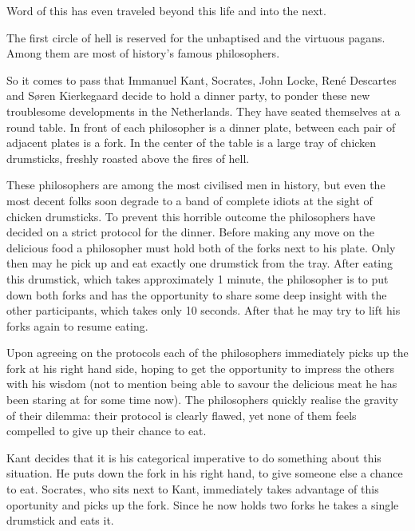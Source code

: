 


{\StandaardZin}
Word of this has even traveled beyond this life and into the next.

The first circle of hell is reserved for the unbaptised and the virtuous pagans.
Among them are most of history's famous philosophers.

So it comes to pass that
Immanuel Kant,
Socrates,
John Locke,
Ren\'e Descartes and
S{\o}ren Kierkegaard
decide to hold a dinner party, to ponder these new troublesome developments in the Netherlands.
They have seated themselves at a round table.
In front of each philosopher is a dinner plate, between each pair of adjacent plates is a fork.
In the center of the table is a large tray of chicken drumsticks, freshly roasted above the fires of hell.

These philosophers are among the most civilised men in history,
but even the most decent folks soon degrade to a band of complete idiots at the sight of chicken drumsticks.
To prevent this horrible outcome the philosophers have decided on a strict protocol for the dinner.
Before making any move on the delicious food a philosopher must hold both of the forks next to his plate.
Only then may he pick up and eat exactly one drumstick from the tray.
After eating this drumstick, which takes approximately 1 minute,
the philosopher is to put down both forks and has the opportunity to share some deep insight with the other participants, which takes only 10 seconds.
After that he may try to lift his forks again to resume eating.


Upon agreeing on the protocols each of the philosophers immediately picks up the fork at his right hand side,
hoping to get the opportunity to impress the others with his wisdom (not to mention being able to savour the delicious meat he has been staring at for some time now). The philosophers quickly realise the gravity of their dilemma: their protocol is clearly flawed, yet none of them feels compelled to give up their chance to eat.

Kant decides that it is his categorical imperative to do something about this situation.
He puts down the fork in his right hand, to give someone else a chance to eat.
Socrates, who sits next to Kant, immediately takes advantage of this oportunity and picks up the fork.
Since he now holds two forks he takes a single drumstick and eats it.

